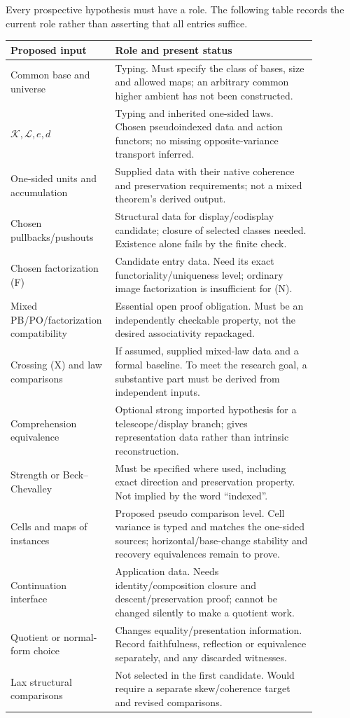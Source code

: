 \documentclass[11pt,a4paper]{article}
\newcommand{\K}{\mathcal K}
\newcommand{\Lcat}{\mathcal L}
\begin{document}
Every prospective hypothesis must have a role. The following table records the
current role rather than asserting that all entries suffice.

\small
\begin{longtable}{@{}p{0.24\linewidth}p{0.63\linewidth}@{}}
\toprule
Proposed input & Role and present status \\
\midrule
\endhead
Common base and universe & Typing. Must specify the class of bases, size and allowed maps; an arbitrary common higher ambient has not been constructed. \\
\(\K,\Lcat,e,d\) & Typing and inherited one-sided laws. Chosen pseudoindexed data and action functors; no missing opposite-variance transport inferred. \\
One-sided units and accumulation & Supplied data with their native coherence and preservation requirements; not a mixed theorem's derived output. \\
Chosen pullbacks/pushouts & Structural data for display/codisplay candidate; closure of selected classes needed. Existence alone fails by the finite check. \\
Chosen factorization (F) & Candidate entry data. Need its exact functoriality/uniqueness level; ordinary image factorization is insufficient for (N). \\
Mixed PB/PO/factorization compatibility & Essential open proof obligation. Must be an independently checkable property, not the desired associativity repackaged. \\
Crossing (X) and law comparisons & If assumed, supplied mixed-law data and a formal baseline. To meet the research goal, a substantive part must be derived from independent inputs. \\
Comprehension equivalence & Optional strong imported hypothesis for a telescope/display branch; gives representation data rather than intrinsic reconstruction. \\
Strength or Beck--Chevalley & Must be specified where used, including exact direction and preservation property. Not implied by the word ``indexed''. \\
Cells and maps of instances & Proposed pseudo comparison level. Cell variance is typed and matches the one-sided sources; horizontal/base-change stability and recovery equivalences remain to prove. \\
Continuation interface & Application data. Needs identity/composition closure and descent/preservation proof; cannot be changed silently to make a quotient work. \\
Quotient or normal-form choice & Changes equality/presentation information. Record faithfulness, reflection or equivalence separately, and any discarded witnesses. \\
Lax structural comparisons & Not selected in the first candidate. Would require a separate skew/coherence target and revised comparisons. \\
\bottomrule
\end{longtable}
\normalsize
\end{document}
